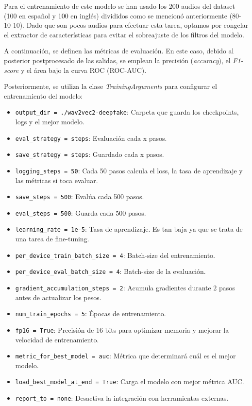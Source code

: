 Para el entrenamiento de este modelo se han usado los 200 audios del dataset (100 en español y 100 en inglés) divididos como se mencionó anteriormente (80-10-10). Dado que son pocos audios para efectuar esta tarea, optamos por congelar el extractor de características para evitar el sobreajuste de los filtros del modelo.

A continuación, se definen las métricas de evaluación. En este caso, debido al posterior postprocesado de las salidas, se emplean la precisión (\textit{accuracy}), el \textit{F1-score} y el área bajo la curva ROC (ROC-AUC).

Posteriormente, se utiliza la clase \textit{TrainingArguments} para configurar el entrenamiento del modelo:

\begin{itemize}
 \item \texttt{output\_dir = ./wav2vec2-deepfake}: Carpeta que guarda los checkpoints, logs y el mejor modelo.
 \item \texttt{eval\_strategy = steps}: Evaluación cada x pasos.
 \item \texttt{save\_strategy = steps}: Guardado cada x pasos.
 \item \texttt{logging\_steps = 50}: Cada 50 pasos calcula el loss, la tasa de aprendizaje y las métricas si toca evaluar.
 \item \texttt{save\_steps = 500}: Evalúa cada 500 pasos.
 \item \texttt{eval\_steps = 500}: Guarda cada 500 pasos.
 \item \texttt{learning\_rate = 1e-5}: Tasa de aprendizaje. Es tan baja ya que se trata de una tarea de fine-tuning.
 \item \texttt{per\_device\_train\_batch\_size = 4}: Batch-size del entrenamiento.
 \item \texttt{per\_device\_eval\_batch\_size = 4}: Batch-size de la evaluación.
 \item \texttt{gradient\_accumulation\_steps = 2}: Acumula gradientes durante 2 pasos antes de actualizar los pesos.
 \item \texttt{num\_train\_epochs = 5}: Épocas de entrenamiento.
 \item \texttt{fp16 = True}: Precisión de 16 bits para optimizar memoria y mejorar la velocidad de entrenamiento.
 \item \texttt{metric\_for\_best\_model = auc}: Métrica que determinará cuál es el mejor modelo.
 \item \texttt{load\_best\_model\_at\_end = True}: Carga el modelo con mejor métrica AUC.
 \item \texttt{report\_to = none}: Desactiva la integración con herramientas externas.
\end{itemize}


